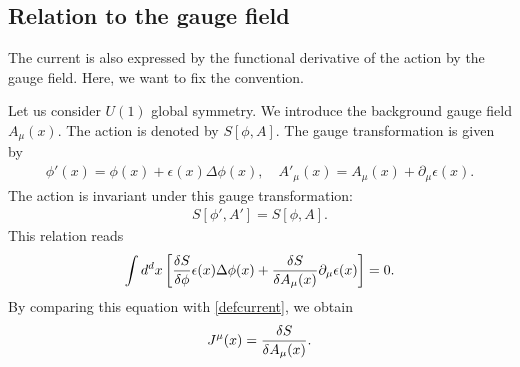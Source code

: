 \documentclass[12pt]{scrartcl}
\newcommand{\del}{\partial}
\begin{document}
\subsection{Relation to the gauge field}

The current is also expressed by the functional derivative of the action by the gauge field.  Here, we want to fix the convention.

Let us consider $U(1)$ global symmetry.   We introduce the background gauge field $A_{\mu}(x)$.  The action is denoted by $S[\phi,A]$.
The gauge transformation is given by
\begin{align}
    \phi'(x)=\phi(x)+\epsilon(x)\Delta \phi(x),\quad
    A'_{\mu}(x)=A_{\mu}(x)+\del_{\mu}\epsilon(x).
\end{align}
The action is invariant under this gauge transformation:
\begin{align}
    S[\phi',A']=S[\phi,A].
\end{align}
This relation reads
\begin{align}
    \int d^dx\left[
        \fdv{S}{\phi}\epsilon(x)\Delta \phi(x)
        +\fdv{S}{A_{\mu}(x)}\del_{\mu}\epsilon(x)
    \right]=0.
\end{align}
By comparing this equation with \eqref{defcurrent}, we obtain
\begin{align}
    J^{\mu}(x)=\fdv{S}{A_{\mu}(x)}.
\end{align}
\end{document}
